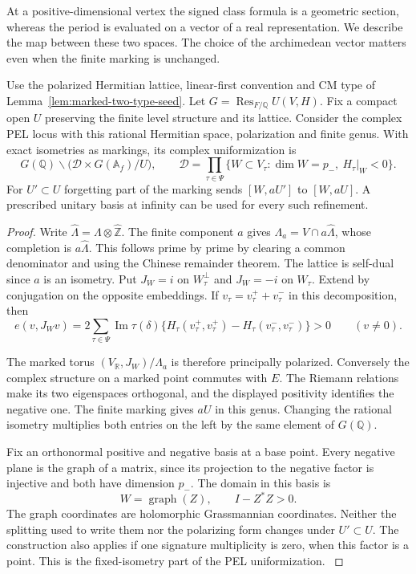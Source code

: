 At a positive-dimensional vertex the signed class formula is a
geometric section, whereas the period is evaluated on a vector of
a real representation. We describe the map between these two spaces.
The choice of the archimedean vector matters even when the finite
marking is unchanged.

\begin{auxlemma}
\label{lem:marked-period-domain}
Use the polarized Hermitian lattice, linear-first convention and
CM type of Lemma~\ref{lem:marked-two-type-seed}. Let
\(G=\operatorname{Res}_{F/\mathbb Q}U(V,H)\). Fix a compact
open \(U\) preserving the finite level structure and its lattice.
Consider the complex PEL locus with this rational Hermitian space,
polarization and finite genus. With exact isometries as markings,
its complex uniformization is
\[
 G(\mathbb Q)\backslash
    \bigl(\mathcal D\times G(\mathbb A_f)/U\bigr),\qquad
 \mathcal D=\prod_{\tau\in\Psi}
      \{W\subset V_\tau:\dim W=p_-,\ H_\tau|_W<0\}.
\]
For \(U'\subset U\) forgetting part of the marking sends
\([W,aU']\) to \([W,aU]\). A prescribed unitary basis at infinity
can be used for every such refinement.
\end{auxlemma}
\begin{proof}
Write \(\widehat\Lambda=\Lambda\otimes\widehat{\mathbb Z}\).
The finite component \(a\) gives
\(\Lambda_a=V\cap a\widehat\Lambda\), whose completion is
\(a\widehat\Lambda\). This follows prime by prime by clearing a
common denominator and using the Chinese remainder theorem. The
lattice is self-dual since \(a\) is an isometry. Put
\(J_W=i\) on \(W_\tau^\perp\) and \(J_W=-i\) on \(W_\tau\).
Extend by conjugation on the opposite embeddings. If
\(v_\tau=v_\tau^++v_\tau^-\) in this decomposition, then
\[
 e(v,J_Wv)=2\sum_{\tau\in\Psi}\operatorname{Im}\tau(\delta)
    \{H_\tau(v_\tau^+,v_\tau^+)-H_\tau(v_\tau^-,v_\tau^-)\}>0
                 \qquad(v\ne0).
\]

The marked torus \((V_{\mathbb R},J_W)/\Lambda_a\) is therefore
principally polarized. Conversely the complex structure on a marked
point commutes with \(E\). The Riemann relations make its two
eigenspaces orthogonal, and the displayed positivity identifies
the negative one. The finite marking gives \(aU\) in this genus.
Changing the rational isometry multiplies both entries on the left
by the same element of \(G(\mathbb Q)\).

Fix an orthonormal positive and negative basis at a base point.
Every negative plane is the graph of a matrix, since its
projection to the negative factor is injective and both have
dimension \(p_-\). The domain in this basis is
\[
                  W=\operatorname{graph}(Z),\qquad I-Z^*Z>0 .
\]
The graph coordinates are holomorphic Grassmannian coordinates.
Neither the splitting used to write them nor the polarizing form
changes under \(U'\subset U\). The construction also applies if
one signature multiplicity is zero, when this factor is a point.
This is the fixed-isometry part of the PEL uniformization.
\cite[Section~8]{milne-pel-period-domain}
\end{proof}

